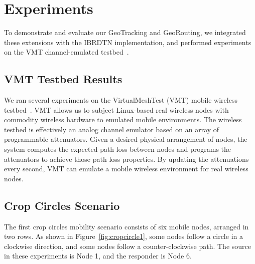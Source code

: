 \section{Experiments}\label{sec:experiments}
To demonstrate and evaluate our GeoTracking and GeoRouting, 
we integrated these extensions with the IBRDTN implementation, and performed experiments on 
the VMT channel-emulated testbed~\cite{hahn10:using, kim11:reality}.  

\subsection{VMT Testbed Results}\label{sec:vmtresults}
We ran several experiments on the VirtualMeshTest (VMT)
mobile wireless testbed~\cite{hahn10:using, kim11:reality}.
VMT allows us to subject Linux-based real wireless nodes with commodity 
wireless hardware to emulated mobile environments.  The 
wireless testbed is effectively an analog channel emulator based
on an array of programmable attenuators.  Given a desired physical arrangement
of nodes, the system computes the expected path loss between
nodes and programs the attenuators to achieve those path loss
properties.  By updating the attenuations every second, VMT can
emulate a mobile wireless environment for real wireless nodes.

\subsection{Crop Circles Scenario}

The first crop circles mobility scenario consists of six mobile nodes, arranged in two rows. As shown in 
Figure~\ref{fig:cropcircle1}, some nodes follow a circle in a clockwise direction, and some nodes follow a counter-clockwise path. The source in these experiments is Node 1, and the responder is Node 6.


